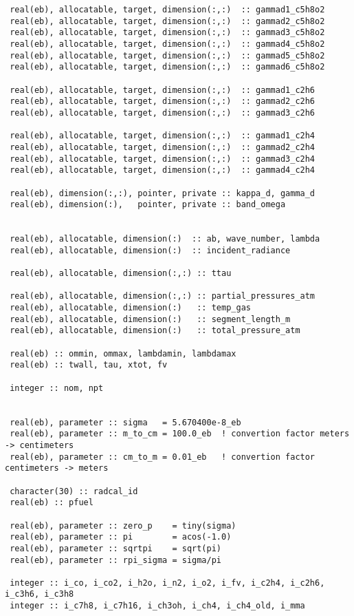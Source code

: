 \begin{lstlisting}
 real(eb), allocatable, target, dimension(:,:)  :: gammad1_c5h8o2
 real(eb), allocatable, target, dimension(:,:)  :: gammad2_c5h8o2
 real(eb), allocatable, target, dimension(:,:)  :: gammad3_c5h8o2
 real(eb), allocatable, target, dimension(:,:)  :: gammad4_c5h8o2
 real(eb), allocatable, target, dimension(:,:)  :: gammad5_c5h8o2
 real(eb), allocatable, target, dimension(:,:)  :: gammad6_c5h8o2

 real(eb), allocatable, target, dimension(:,:)  :: gammad1_c2h6
 real(eb), allocatable, target, dimension(:,:)  :: gammad2_c2h6
 real(eb), allocatable, target, dimension(:,:)  :: gammad3_c2h6

 real(eb), allocatable, target, dimension(:,:)  :: gammad1_c2h4
 real(eb), allocatable, target, dimension(:,:)  :: gammad2_c2h4
 real(eb), allocatable, target, dimension(:,:)  :: gammad3_c2h4
 real(eb), allocatable, target, dimension(:,:)  :: gammad4_c2h4

 real(eb), dimension(:,:), pointer, private :: kappa_d, gamma_d
 real(eb), dimension(:),   pointer, private :: band_omega


 real(eb), allocatable, dimension(:)  :: ab, wave_number, lambda
 real(eb), allocatable, dimension(:)  :: incident_radiance

 real(eb), allocatable, dimension(:,:) :: ttau

 real(eb), allocatable, dimension(:,:) :: partial_pressures_atm
 real(eb), allocatable, dimension(:)   :: temp_gas
 real(eb), allocatable, dimension(:)   :: segment_length_m
 real(eb), allocatable, dimension(:)   :: total_pressure_atm

 real(eb) :: ommin, ommax, lambdamin, lambdamax
 real(eb) :: twall, tau, xtot, fv

 integer :: nom, npt


 real(eb), parameter :: sigma   = 5.670400e-8_eb
 real(eb), parameter :: m_to_cm = 100.0_eb  ! convertion factor meters -> centimeters
 real(eb), parameter :: cm_to_m = 0.01_eb   ! convertion factor centimeters -> meters

 character(30) :: radcal_id
 real(eb) :: pfuel

 real(eb), parameter :: zero_p    = tiny(sigma)
 real(eb), parameter :: pi        = acos(-1.0)
 real(eb), parameter :: sqrtpi    = sqrt(pi)
 real(eb), parameter :: rpi_sigma = sigma/pi

 integer :: i_co, i_co2, i_h2o, i_n2, i_o2, i_fv, i_c2h4, i_c2h6, i_c3h6, i_c3h8
 integer :: i_c7h8, i_c7h16, i_ch3oh, i_ch4, i_ch4_old, i_mma


\end{lstlisting}

